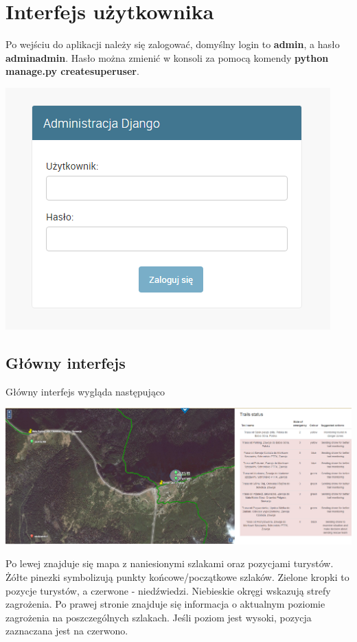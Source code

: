 \documentclass[a4paper,12pt]{article}
\begin{document}
\section{Interfejs użytkownika}
Po wejściu do aplikacji należy się zalogować, domyślny login to \textbf{admin}, a hasło \textbf{adminadmin}. Hasło można zmienić w konsoli za pomocą komendy \textbf{python manage.py createsuperuser}.
\begin{center}
\includegraphics[scale=1]{ui0.png}
\end{center}
\subsection{Główny interfejs}
Główny interfejs wygląda następująco
\begin{center}
\includegraphics[scale=0.4]{ui1.png}
\end{center}
Po lewej znajduje się mapa z naniesionymi szlakami oraz pozycjami turystów. Żółte pinezki symbolizują punkty końcowe/początkowe szlaków. Zielone kropki to pozycje turystów, a czerwone - niedźwiedzi. Niebieskie okręgi wskazują strefy zagrożenia. Po prawej stronie znajduje się informacja o aktualnym poziomie zagrożenia na poszczególnych szlakach. Jeśli poziom jest wysoki, pozycja zaznaczana jest na czerwono.
\end{document}
